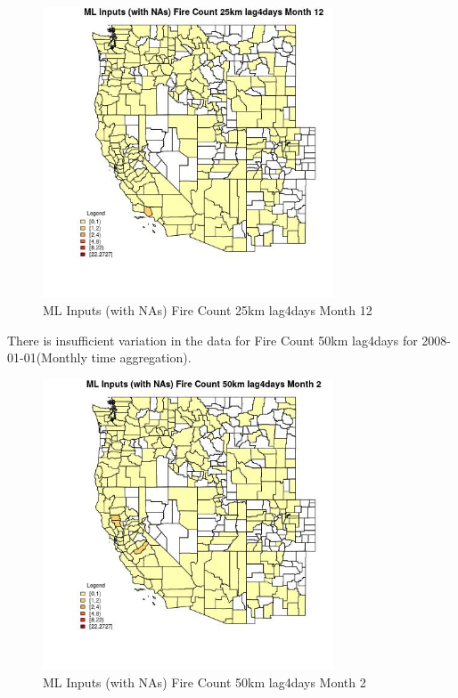\begin{figure} 
\centering  
\includegraphics[width=0.77\textwidth]{Code_Outputs/Report_ML_input_PM25_Step4_part_f_de_duplicated_aveswNAs_CountyFire_Count_25km_lag4daysmedianMonth12.jpg} 
\caption{\label{fig:Report_ML_input_PM25_Step4_part_f_de_duplicated_aveswNAsCountyFire_Count_25km_lag4daysmedianMonth12}ML Inputs (with NAs) Fire Count 25km lag4days Month 12} 
\end{figure} 
 

There is insufficient variation in the data for Fire Count 50km lag4days for 2008-01-01(Monthly time aggregation). 
 

\begin{figure} 
\centering  
\includegraphics[width=0.77\textwidth]{Code_Outputs/Report_ML_input_PM25_Step4_part_f_de_duplicated_aveswNAs_CountyFire_Count_50km_lag4daysmedianMonth2.jpg} 
\caption{\label{fig:Report_ML_input_PM25_Step4_part_f_de_duplicated_aveswNAsCountyFire_Count_50km_lag4daysmedianMonth2}ML Inputs (with NAs) Fire Count 50km lag4days Month 2} 
\end{figure} 
 

